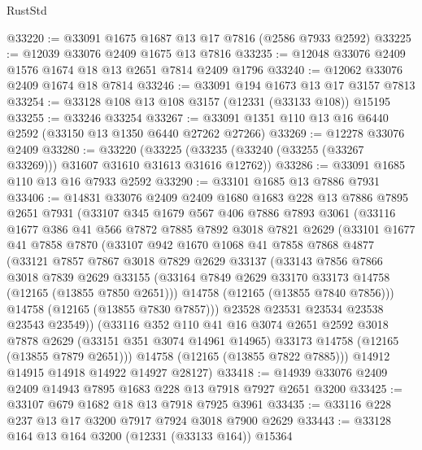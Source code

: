 \begin{lexlean}{RustStd}
\begin{coremodule}
@33220 := @33091 @1675 @1687 @13 @17 @7816 (@2586 @7933 @2592)
@33225 := @12039 @33076 @2409 @1675 @13 @7816
@33235 := @12048 @33076 @2409 @1576 @1674 @18 @13 @2651 @7814 @2409 @1796
@33240 := @12062 @33076 @2409 @1674 @18 @7814
@33246 := @33091 @194 @1673 @13 @17 @3157 @7813
@33254 := @33128 @108 @13 @108 @3157 (@12331 (@33133 @108)) @15195
@33255 := @33246 @33254
@33267 := @33091 @1351 @110 @13 @16 @6440 @2592 (@33150 @13 @1350 @6440 @27262 @27266)
@33269 := @12278 @33076 @2409
@33280 := @33220
    (@33225 (@33235 (@33240 (@33255 (@33267 @33269))) @31607 @31610 @31613 @31616 @12762))
@33286 := @33091 @1685 @110 @13 @16 @7933 @2592
@33290 := @33101 @1685 @13 @7886 @7931
@33406 := @14831
    @33076
    @2409
    @2409
    @1680
    @1683
    @228
    @13
    @7886
    @7895
    @2651
    @7931
    (@33107
      @345
      @1679
      @567
      @406
      @7886
      @7893
      @3061
      (@33116
        @1677
        @386
        @41
        @566
        @7872
        @7885
        @7892
        @3018
        @7821
        @2629
        (@33101
          @1677
          @41
          @7858
          @7870
          (@33107
            @942
            @1670
            @1068
            @41
            @7858
            @7868
            @4877
            (@33121
              @7857
              @7867
              @3018
              @7829
              @2629
              @33137
              (@33143
                @7856
                @7866
                @3018
                @7839
                @2629
                @33155
                (@33164 @7849 @2629 @33170 @33173 @14758 (@12165 (@13855 @7850 @2651)))
                @14758
                (@12165 (@13855 @7840 @7856)))
              @14758
              (@12165 (@13855 @7830 @7857)))
            @23528
            @23531
            @23534
            @23538
            @23543
            @23549))
        (@33116
          @352
          @110
          @41
          @16
          @3074
          @2651
          @2592
          @3018
          @7878
          @2629
          (@33151 @351 @3074 @14961 @14965)
          @33173
          @14758
          (@12165 (@13855 @7879 @2651)))
        @14758
        (@12165 (@13855 @7822 @7885)))
      @14912
      @14915
      @14918
      @14922
      @14927
      @28127)
@33418 := @14939 @33076 @2409 @2409 @14943 @7895 @1683 @228 @13 @7918 @7927 @2651 @3200
@33425 := @33107 @679 @1682 @18 @13 @7918 @7925 @3961
@33435 := @33116 @228 @237 @13 @17 @3200 @7917 @7924 @3018 @7900 @2629
@33443 := @33128 @164 @13 @164 @3200 (@12331 (@33133 @164)) @15364

\end{coremodule}
\end{lexlean}
